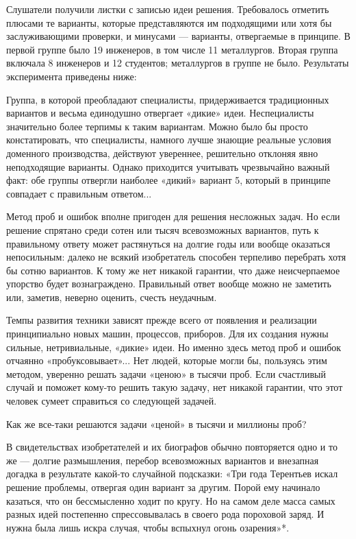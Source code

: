 Слушатели получили листки с записью идеи решения. Требовалось отметить
плюсами те  варианты, которые  представляются им подходящими  или хотя
бы  заслуживающими  проверки, и  минусами  —  варианты, отвергаемые  в
принципе.  В  первой  группе  было   19  инженеров,  в  том  числе  11
металлургов.  Вторая  группа  включала  8 инженеров  и  12  студентов;
металлургов в группе не было. Результаты эксперимента приведены ниже:


Группа, в которой преобладают специалисты, придерживается традиционных
вариантов и  весьма единодушно  отвергает «дикие»  идеи. Неспециалисты
значительно  более терпимы  к таким  вариантам. Можно  было бы  просто
констатировать,  что  специалисты,   намного  лучше  знающие  реальные
условия  доменного   производства,  действуют   увереннее,  решительно
отклоняя  явно  неподходящие  варианты.  Однако  приходится  учитывать
чрезвычайно важный факт: обе  группы отвергли наиболее «дикий» вариант
5, который в принципе совпадает с правильным ответом...







Метод проб  и ошибок вполне  пригоден для решения несложных  задач. Но
если решение  спрятано среди  сотен или тысяч  всевозможных вариантов,
путь  к  правильному  ответу  может растянуться  на  долгие  годы  или
вообще оказаться  непосильным: далеко не всякий  изобретатель способен
терпеливо перебрать  хотя бы  сотню вариантов. К  тому же  нет никакой
гарантии,  что   даже  неисчерпаемое  упорство   будет  вознаграждено.
Правильный  ответ  вообще  можно  не заметить  или,  заметив,  неверно
оценить, счесть неудачным.

Темпы развития техники зависят прежде  всего от появления и реализации
принципиально новых машин, процессов,  приборов. Для их создания нужны
сильные, нетривиальные,  «дикие» идеи.  Но именно  здесь метод  проб и
ошибок  отчаянно  «пробуксовывает»...  Нет людей,  которые  могли  бы,
пользуясь этим методом, уверенно решать  задачи «ценою» в тысячи проб.
Если  счастливый случай  и поможет  кому-то решить  такую задачу,  нет
никакой  гарантии, что  этот  человек сумеет  справиться со  следующей
задачей.

Как же все-таки решаются задачи «ценой» в тысячи и миллионы проб?






В свидетельствах изобретателей и  их биографов обычно повторяется одно
и  то  же  —  долгие размышления,  перебор  всевозможных  вариантов  и
внезапная догадка в результате какой-то случайной подсказки: «Три года
Терентьев  искал решение  проблемы, отвергая  один вариант  за другим.
Порой ему начинало казаться, что он бессмысленно ходит по кругу. Но на
самом деле масса самых разных идей постепенно спрессовывалась в своего
рода пороховой заряд.  И нужна была лишь искра  случая, чтобы вспыхнул
огонь озарения»*.

